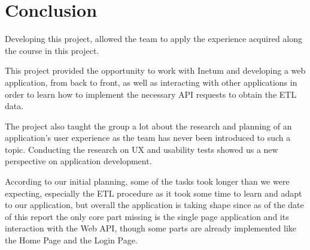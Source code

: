 \documentclass[a4paper,twoside,10pt]{report}
\begin{document}
\chapter{Conclusion}

Developing this project, allowed the team to apply the experience acquired along the course in this project.

This project provided the opportunity to work with Inetum and developing a web application, from back to front, as well as interacting with other applications in order
to learn how to implement the necessary API requests to obtain the ETL data.

The project also taught the group a lot about the research and planning of an application's user experience as the team has never been introduced to such a topic. Conducting the research on UX and usability tests showed us a new perspective on application development.

According to our initial planning, some of the tasks took longer than we were expecting, especially the ETL procedure as it took some time to learn and adapt to our application, but overall the application is taking shape since as of the date of this report the only core part missing is the single page application and its interaction with the Web API, though some parts are already implemented like the Home Page and the Login Page.
\end{document}
